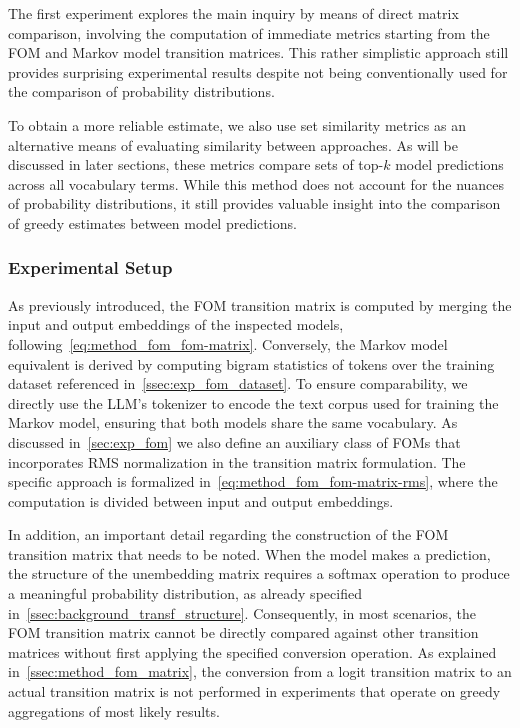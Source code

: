 The first experiment explores the main inquiry by means of direct matrix comparison, involving the computation of immediate metrics starting from the FOM and Markov model transition matrices.
This rather simplistic approach still provides surprising experimental results despite not being conventionally used for the comparison of probability distributions.

To obtain a more reliable estimate, we also use set similarity metrics as an alternative means of evaluating similarity between approaches.
As will be discussed in later sections, these metrics compare sets of top-$k$ model predictions across all vocabulary terms.
While this method does not account for the nuances of probability distributions, it still provides valuable insight into the comparison of greedy estimates between model predictions.

\subsubsection{Experimental Setup}\label{sssec:exp_fom_exp1_expset}

As previously introduced, the FOM transition matrix is computed by merging the input and output embeddings of the inspected models, following~\cref{eq:method_fom_fom-matrix}.
Conversely, the Markov model equivalent is derived by computing bigram statistics of tokens over the training dataset referenced in~\cref{ssec:exp_fom_dataset}.
To ensure comparability, we directly use the LLM's tokenizer to encode the text corpus used for training the Markov model, ensuring that both models share the same vocabulary.
As discussed in~\cref{sec:exp_fom} we also define an auxiliary class of FOMs that incorporates RMS normalization in the transition matrix formulation.
The specific approach is formalized in~\cref{eq:method_fom_fom-matrix-rms}, where the computation is divided between input and output embeddings.

In addition, an important detail regarding the construction of the FOM transition matrix that needs to be noted.
When the model makes a prediction, the structure of the unembedding matrix requires a softmax operation to produce a meaningful probability distribution, as already specified in~\cref{ssec:background_transf_structure}.
Consequently, in most scenarios, the FOM transition matrix cannot be directly compared against other transition matrices without first applying the specified conversion operation.
As explained in~\cref{ssec:method_fom_matrix}, the conversion from a logit transition matrix to an actual transition matrix is not performed in experiments that operate on greedy aggregations of most likely results.

